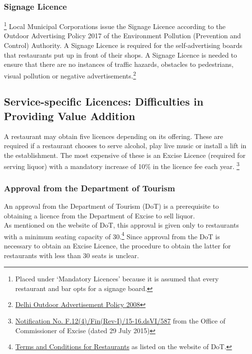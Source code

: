 \documentclass[a4paper, 12pt]{article}
\begin{document}
		\subsubsection{Signage Licence}\footnote{Placed under ‘Mandatory Licences’ because it is assumed that every restaurant and bar opts for a signage board.}
		Local Municipal Corporations issue the Signage Licence according to the Outdoor Advertising Policy 2017 of the Environment Pollution (Prevention and Control) Authority. A Signage Licence is required for the self-advertising boards that restaurants put up in front of their shops. A Signage Licence is needed to ensure that there are no instances of traffic hazards, obstacles to pedestrians, visual pollution or negative advertisements.\footnote{\href{https://bit.ly/2xdiNzk}{Delhi Outdoor Advertisement Policy 2008}}\\
		
		\subsection{Service-specific Licences: Difficulties in Providing Value Addition}
		
		A restaurant may obtain five licences depending on its offering. These are required if a restaurant chooses to serve alcohol, play live music or install a lift in the establishment. The most expensive of these is an Excise Licence (required for serving liquor) with a mandatory increase of 10\% in the licence fee each year. \footnote{\href{https://bit.ly/2xoejoG}{Notification No. F.12(4)/Fin(Rev-I)/15-16.dsVI/587} from the Office of Commissioner of Excise (dated 29 July 2015)}
		
		\subsubsection{Approval from the Department of Tourism}
		An approval from the Department of Tourism (DoT) is a prerequisite to obtaining a licence from the Department of Excise to sell liquor.\\
		As mentioned on the website of DoT, this approval is given only to restaurants with a minimum seating capacity of 30.\footnote{\href{https://bit.ly/2NMdccI}{Terms and Conditions for Restaurants} as listed on the website of DoT.}  Since approval from the DoT is necessary to obtain an Excise Licence, the procedure to obtain the latter for restaurants with less than 30 seats is unclear. %
		
\end{document}
